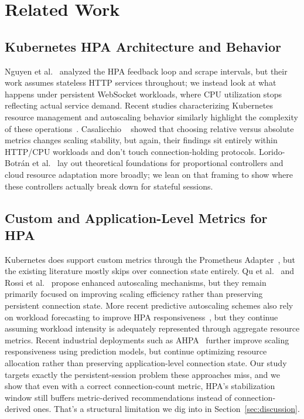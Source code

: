 \documentclass[twocolumn]{svjour3}
\begin{document}
\section{Related Work}
\label{sec:related}

\subsection{Kubernetes HPA Architecture and Behavior}

Nguyen et al.~\cite{nguyen2020hpa} analyzed the HPA feedback loop and scrape
intervals, but their work assumes stateless HTTP services throughout; we instead
look at what happens under persistent WebSocket workloads, where CPU utilization
stops reflecting actual service demand. Recent studies characterizing Kubernetes resource management and autoscaling behavior similarly highlight the complexity of these operations~\cite{medel2024characterising}. Casalicchio
~\cite{casalicchio2019performance} showed that choosing relative versus absolute metrics
changes scaling stability, but again, their findings sit entirely within
HTTP/CPU workloads and don't touch connection-holding protocols. Lorido-Botr{\'a}n
et al.~\cite{lorido2014auto} lay out theoretical foundations
for proportional controllers and cloud resource adaptation more broadly; we lean on
that framing to show where these controllers actually break down for stateful
sessions.

\subsection{Custom and Application-Level Metrics for HPA}

Kubernetes does support custom metrics through the Prometheus
Adapter~\cite{prometheus_adapter}, but the existing literature mostly skips over
connection state entirely. Qu et al.~\cite{qu2018auto} and Rossi et
al.~\cite{rossi2019horizontal} propose enhanced autoscaling mechanisms, but they remain primarily focused on improving scaling efficiency rather than preserving persistent connection state. More recent predictive autoscaling schemes also rely on workload forecasting to improve HPA responsiveness~\cite{liu2023prediction}, but they continue assuming workload intensity is adequately represented through aggregate resource metrics. Recent industrial deployments such as AHPA~\cite{zhou2024ahpa} further improve scaling responsiveness using prediction models, but continue optimizing resource allocation rather than preserving application-level connection state. Our study targets exactly the
persistent-session problem these approaches miss, and we show that even with a
correct connection-count metric, HPA's stabilization window still buffers
metric-derived recommendations instead of connection-derived ones. That's a
structural limitation we dig into in Section~\ref{sec:discussion}.
\end{document}
